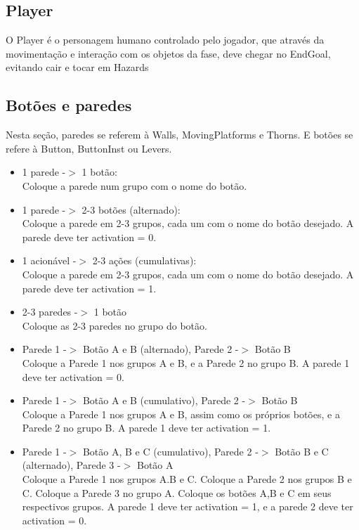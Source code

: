 \documentclass[a4paper, 11pt]{article}
\begin{document}
		\subsection{Player}
			O Player é o personagem humano controlado pelo jogador, que através da movimentação e interação com os objetos da fase, deve chegar no EndGoal, evitando cair e  tocar em Hazards

		\subsection{Botões e paredes}
			Nesta seção, paredes se referem à Walls, MovingPlatforms e Thorns. E botões se refere à Button, ButtonInst ou Levers.
			\begin{itemize}
				\item 1 parede -$>$ 1 botão:
				\\
				Coloque a parede num grupo com o nome do botão.
				\item 1 parede -$>$ 2-3 botões (alternado):
				\\
				Coloque a parede em 2-3 grupos, cada um com o nome do botão desejado.
				A parede deve ter activation = 0.
				\item 1 acionável -$>$ 2-3 ações (cumulativas):
				\\
				Coloque a parede em 2-3 grupos, cada um com o nome do botão desejado.
				A parede deve ter activation = 1.
				\item 2-3 paredes -$>$ 1 botão
				\\
				Coloque as 2-3 paredes no grupo do botão.
				\item Parede 1 -$>$ Botão A e B (alternado), Parede 2 -$>$ Botão B
				\\
				Coloque a Parede 1 nos grupos A e B, e a Parede 2 no grupo B.
				A parede 1 deve ter activation = 0.
				\item Parede 1 -$>$ Botão A e B (cumulativo), Parede 2 -$>$ Botão B
				\\
				Coloque a Parede 1 nos grupos A e B, assim como os próprios botões, e a Parede 2 no grupo B. 
				A parede 1 deve ter activation = 1.
				\item Parede 1 -$>$ Botão A, B e C (cumulativo), Parede 2 -$>$ Botão B e C (alternado), Parede 3 -$>$ Botão A
				\\
				Coloque a Parede 1 nos grupos A.B e C. Coloque a Parede 2 nos grupos B e C. Coloque a Parede 3 no grupo A. Coloque os botões A,B e C em seus respectivos grupos.
				A parede 1 deve ter activation = 1, e a parede 2 deve ter activation = 0.

\end{itemize}
\end{document}

